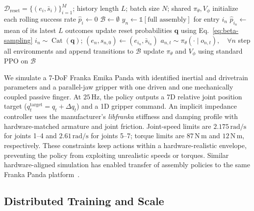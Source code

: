 \begin{algorithm}[t]
    \caption{AlphaNIST Heterogeneous Assembly Learning}
    \label{alg:training}
    \small
    \begin{algorithmic}[1]
        \Require $\mathcal{D}_{\mathrm{reset}}=\{(e_i,\bar{s}_i)\}_{i=1}^{M}$;
        history length $L$; batch size $N$; shared $\pi_\theta,V_\phi$
        \State initialize each rolling success rate $\hat{p}_i\gets0$
            \State $\mathcal{B}\gets\emptyset$
                    \State $y_n\gets\mathbb{1}[\text{full assembly}]$
                    for entry $i_n$
                    \State $\hat{p}_{i_n}\gets$ mean of its latest $L$ outcomes
                \EndFor
                \State update reset probabilities
                $\mathbf q$ using Eq.~\eqref{eq:beta-sampling}
                    \State $i_n\sim\operatorname{Cat}(\mathbf q)$;
                    $(e_n,s_{n,0})\gets(e_{i_n},\bar{s}_{i_n})$
                \EndFor
                \State $a_{n,t}\sim\pi_\theta(\cdot\mid o_{n,t}),\quad\forall n$
                \State step all environments and append transitions to $\mathcal{B}$
            \EndWhile
            \State update $\pi_\theta$ and $V_\phi$ using standard PPO on $\mathcal{B}$
        \EndFor
    \end{algorithmic}
\end{algorithm}

We simulate a 7-DoF Franka Emika Panda with identified inertial and drivetrain
parameters and a parallel-jaw gripper with one driven and one mechanically
coupled passive finger. At $25\,\mathrm{Hz}$, the policy outputs a 7D relative joint position target ($q_t^{\mathrm{target}} = q_t + \Delta q_t$) and a 1D gripper command.
An implicit impedance controller uses the manufacturer's \textit{libfranka} stiffness
and damping profile with
hardware-matched armature and joint friction. Joint-speed limits are $2.175\,\mathrm{rad/s}$ for joints 1--4 and $2.61\,\mathrm{rad/s}$ for joints
5--7; torque limits are $87\,\mathrm{N\,m}$ and $12\,\mathrm{N\,m}$,
respectively. 
These constraints keep actions within a hardware-realistic
envelope, preventing the policy from exploiting unrealistic speeds or
torques. 
Similar hardware-aligned simulation has enabled transfer of
assembly policies to the same Franka Panda
platform~\cite{tang2023industreal,tang2024automate}.

\subsection{Distributed Training and Scale}

